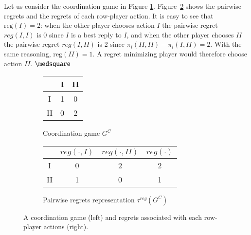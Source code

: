 \documentclass[fleqn,reqno,11pt]{article}
\begin{document}
\begin{example}
  Let us consider the coordination game in Figure \ref{coordgame1}. Figure~\ref{coordgame1reg}
  shows the pairwise regrets and the regrets of each row-player action. It is easy to see that
  $\text{reg}(I)=2$: when the other player chooses action $I$ the pairwise regret $reg(I,I)$ is
  $0$ since $I$ is a best reply to $I$, and when the other player chooses $II$ the pairwise
  regret $reg(I, II)$ is $2$ since $\pi_i(II,II)-\pi_i(I,II)=2$. With the same reasoning,
  $\text{reg}(II)=1$. A regret minimizing player would therefore choose action $II$. $ \medsquare $

\begin{figure}

  \begin{subfigure}[b]{0.3\textwidth}
    \centering
    \begin{tabular}{ccc}
      \toprule
      & I & II \\
      \midrule
      I & 1 & 0 \\
      II & 0 & 2\\
      \bottomrule
    \end{tabular}
    \caption{Coordination game $G^C$}
    \label{coordgame1}
  \end{subfigure}
  \hspace{1cm}
  \begin{subfigure}[b]{0.5\textwidth}
    \centering
    \begin{tabular}{cccc}
      \toprule
      & $reg( \cdot, I)$ & $reg(\cdot, II)$ & $reg(\cdot)$ \\
      \midrule
      I  & 0 & 2 & 2 \\ 
      II & 1 & 0 & 1\\
      \bottomrule
    \end{tabular}
    \caption{Pairwise regrets representation $\tau^{reg}(G^C)$}
    \label{coordgame1reg}
  \end{subfigure}
  \caption{A coordination game (left) and regrets associated with each row-player actions (right).}
    \label{coordgame1mainFig}
\end{figure}

\end{example}
\end{document}
